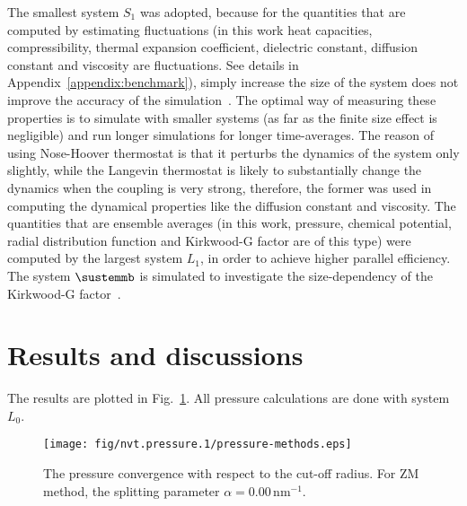 \documentclass[aip,jcp,a4paper,preprint,unsortedaddress,onecolumn,fleqn]{revtex4-1}
\newcommand{\systemsb}{S_1}
\newcommand{\systemla}{L_0}
\newcommand{\systemlb}{L_1}
\begin{document}

The smallest system $\systemsb$ was adopted,
because for the quantities that are computed  by estimating fluctuations (in this
work heat capacities, compressibility, thermal expansion coefficient, dielectric constant, diffusion constant and
viscosity are fluctuations. See details in Appendix~\ref{appendix:benchmark}), simply increase the size of the
system does not improve the accuracy of the 
simulation~\cite{milchev1986fluctuations,ferrenberg1991statistical}.
The optimal way of measuring these properties
is to simulate with smaller systems (as far as the finite size effect is negligible) and run longer simulations for longer time-averages.
The reason of using Nose-Hoover thermostat is that
it perturbs the dynamics of the system only slightly, while the
Langevin thermostat is likely to substantially change the dynamics
when the coupling is very strong, therefore, the former was used in computing the dynamical
properties like the diffusion constant and viscosity.
The quantities that
are ensemble averages (in this work, pressure, chemical potential, radial distribution function and Kirkwood-G factor are of this type)
were computed by the largest system $\systemlb$,
in order to achieve higher parallel efficiency.
The system $\sustemmb$ is simulated to investigate the size-dependency of the
Kirkwood-G factor~\cite{vanderSpoel2006origin}.

\section{Results and discussions}

The results are plotted in Fig.~\ref{fig:tmp0}. All pressure calculations are done with system $\systemla$.
\begin{figure}
  \centering
  \texttt{[image: fig/nvt.pressure.1/pressure-methods.eps]}
  \caption{The pressure convergence with respect to the cut-off radius.
    For ZM method, the splitting parameter $\alpha = 0.00\,\textrm{nm}^{-1}$.
  }
  \label{fig:tmp0}
\end{figure}
\end{document}
